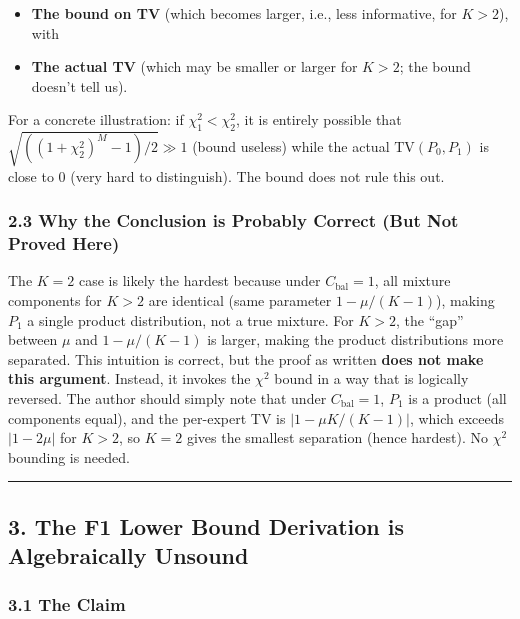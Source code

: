 \documentclass[
  12pt,
]{article}
\providecommand{\tightlist}{%
  \setlength{\itemsep}{0pt}\setlength{\parskip}{0pt}}
\begin{document}
\begin{itemize}
\tightlist
\item
  \textbf{The bound on TV} (which becomes larger, i.e., less
  informative, for \(K>2\)), with
\item
  \textbf{The actual TV} (which may be smaller or larger for \(K>2\);
  the bound doesn't tell us).
\end{itemize}

For a concrete illustration: if \(\chi^2_1 < \chi^2_2\), it is entirely
possible that \(\sqrt{((1+\chi^2_2)^M - 1)/2} \gg 1\) (bound useless)
while the actual \(\text{TV}(P_0, P_1)\) is close to 0 (very hard to
distinguish). The bound does not rule this out.

\subsubsection{2.3 Why the Conclusion is Probably Correct (But Not
Proved
Here)}\label{why-the-conclusion-is-probably-correct-but-not-proved-here}

The \(K=2\) case is likely the hardest because under
\(C_{\text{bal}}=1\), all mixture components for \(K>2\) are identical
(same parameter \(1-\mu/(K-1)\)), making \(P_1\) a single product
distribution, not a true mixture. For \(K>2\), the ``gap'' between
\(\mu\) and \(1-\mu/(K-1)\) is larger, making the product distributions
more separated. This intuition is correct, but the proof as written
\textbf{does not make this argument}. Instead, it invokes the \(\chi^2\)
bound in a way that is logically reversed. The author should simply note
that under \(C_{\text{bal}}=1\), \(P_1\) is a product (all components
equal), and the per-expert TV is \(|1 - \mu K/(K-1)|\), which exceeds
\(|1-2\mu|\) for \(K>2\), so \(K=2\) gives the smallest separation
(hence hardest). No \(\chi^2\) bounding is needed.

\begin{center}\rule{0.5\linewidth}{0.5pt}\end{center}

\subsection{3. The F1 Lower Bound Derivation is Algebraically
Unsound}\label{the-f1-lower-bound-derivation-is-algebraically-unsound}

\subsubsection{3.1 The Claim}\label{the-claim}
\end{document}
